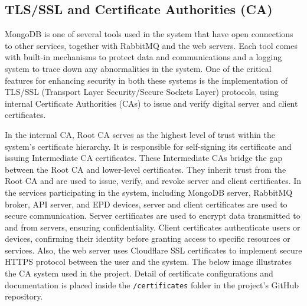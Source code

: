 \documentclass[../Main.tex]{subfiles}
\begin{document}
\subsection{TLS/SSL and Certificate Authorities (CA)}
MongoDB is one of several tools used in the system that have open connections to other services, together with RabbitMQ and the web servers. Each tool comes with built-in mechanisms to protect data and communications and a logging system to trace down any abnormalities in the system. One of the critical features for enhancing security in both these systems is the implementation of TLS/SSL (Transport Layer Security/Secure Sockets Layer) protocols, using internal Certificate Authorities (CAs) to issue and verify digital server and client certificates.

In the internal CA, Root CA serves as the highest level of trust within the system's certificate hierarchy. It is responsible for self-signing its certificate and issuing Intermediate CA certificates. These Intermediate CAs bridge the gap between the Root CA and lower-level certificates. They inherit trust from the Root CA and are used to issue, verify, and revoke server and client certificates. In the services participating in the system, including MongoDB server, RabbitMQ broker, API server, and EPD devices, server and client certificates are used to secure communication. Server certificates are used to encrypt data transmitted to and from servers, ensuring confidentiality. Client certificates authenticate users or devices, confirming their identity before granting access to specific resources or services. Also, the web server uses Cloudflare SSL certificates to implement secure HTTPS protocol between the user and the system. The below image illustrates the CA system used in the project. Detail of certificate configurations and documentation is placed inside the \verb|/certificates| folder in the project's GitHub repository.
\end{document}
